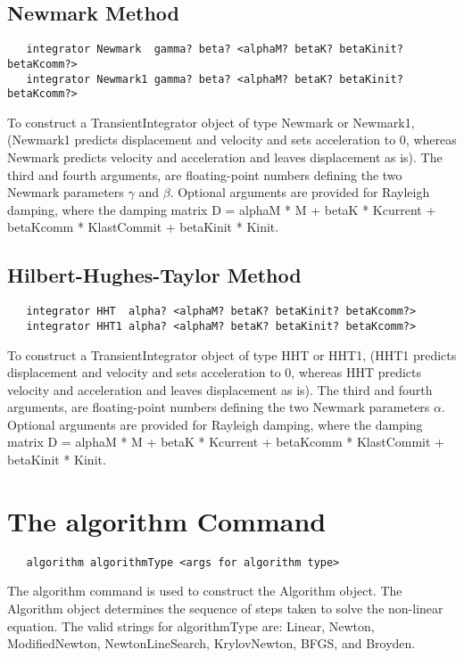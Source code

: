 \documentclass[12pt]{article}
\begin{document}
\subsection{Newmark Method}

{\sf\small
\begin{verbatim}
   integrator Newmark  gamma? beta? <alphaM? betaK? betaKinit? betaKcomm?> 
   integrator Newmark1 gamma? beta? <alphaM? betaK? betaKinit? betaKcomm?> 
\end{verbatim}
}

To construct a TransientIntegrator object of type Newmark or Newmark1,
(Newmark1 predicts displacement and velocity and sets acceleration to
$0$, whereas Newmark predicts velocity and acceleration and leaves
displacement as is). The third and fourth arguments, are
floating-point numbers defining the two Newmark parameters $\gamma$ and
$\beta$. Optional arguments are provided for Rayleigh damping, where
the damping matrix D = alphaM * M + betaK * Kcurrent + betaKcomm *
KlastCommit + betaKinit * Kinit.

\subsection{Hilbert-Hughes-Taylor Method}

{\sf\small
\begin{verbatim}
   integrator HHT  alpha? <alphaM? betaK? betaKinit? betaKcomm?> 
   integrator HHT1 alpha? <alphaM? betaK? betaKinit? betaKcomm?> 
\end{verbatim}
}

To construct a TransientIntegrator object of type HHT or HHT1,
(HHT1 predicts displacement and velocity and sets acceleration to
$0$, whereas HHT predicts velocity and acceleration and leaves
displacement as is). The third and fourth arguments, are
floating-point numbers defining the two Newmark parameters
$\alpha$. Optional arguments are provided for Rayleigh damping, where
the damping matrix D = alphaM * M + betaK * Kcurrent + betaKcomm *
KlastCommit + betaKinit * Kinit.

\section {The algorithm Command}
{\sf\small
\begin{verbatim}
   algorithm algorithmType <args for algorithm type>
\end{verbatim}
}

The algorithm command is used to construct the Algorithm
object. The Algorithm object determines the sequence of steps taken
to solve the non-linear equation. The valid strings for algorithmType
are: Linear, Newton, ModifiedNewton, NewtonLineSearch, KrylovNewton,
BFGS, and Broyden.
\end{document}
